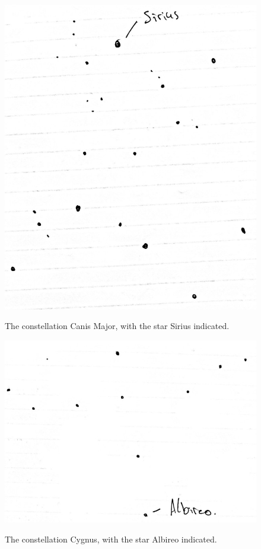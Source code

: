 \documentclass[11pt]{article}
\begin{document}
\begin{figure}[H]
\caption{The constellation Canis Major, with the star Sirius indicated.}
\begin{center}
\includegraphics[scale=0.5]{figures/sirius.jpg}
\label{fig:sirius}
\end{center}
\end{figure}

\begin{figure}[H]
\caption{The constellation Cygnus, with the star Albireo indicated.}
\begin{center}
\includegraphics[scale=0.5]{figures/albireo.jpg}
\label{fig:albireo}
\end{center}
\end{figure}
\end{document}

